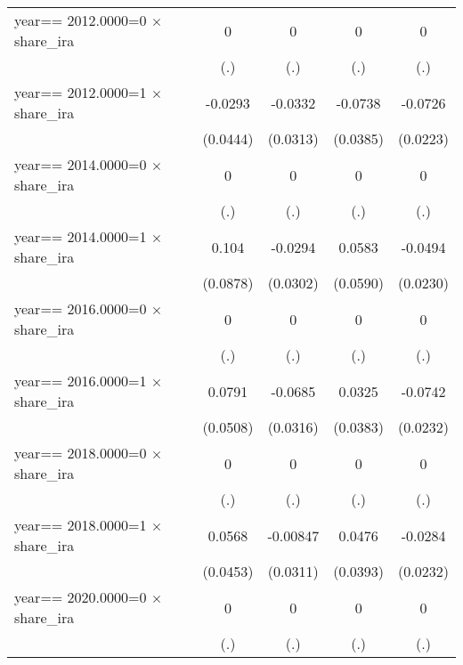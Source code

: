 \begin{table}[htbp]
\begin{tabular}{l*{4}{c}}
year==  2012.0000=0 $\times$ share\_ira&        0         &        0         &        0         &        0         \\
                &      (.)         &      (.)         &      (.)         &      (.)         \\
year==  2012.0000=1 $\times$ share\_ira&  -0.0293         &  -0.0332         &  -0.0738\sym{*}  &  -0.0726\sym{***}\\
                & (0.0444)         & (0.0313)         & (0.0385)         & (0.0223)         \\
year==  2014.0000=0 $\times$ share\_ira&        0         &        0         &        0         &        0         \\
                &      (.)         &      (.)         &      (.)         &      (.)         \\
year==  2014.0000=1 $\times$ share\_ira&    0.104         &  -0.0294         &   0.0583         &  -0.0494\sym{**} \\
                & (0.0878)         & (0.0302)         & (0.0590)         & (0.0230)         \\
year==  2016.0000=0 $\times$ share\_ira&        0         &        0         &        0         &        0         \\
                &      (.)         &      (.)         &      (.)         &      (.)         \\
year==  2016.0000=1 $\times$ share\_ira&   0.0791         &  -0.0685\sym{**} &   0.0325         &  -0.0742\sym{***}\\
                & (0.0508)         & (0.0316)         & (0.0383)         & (0.0232)         \\
year==  2018.0000=0 $\times$ share\_ira&        0         &        0         &        0         &        0         \\
                &      (.)         &      (.)         &      (.)         &      (.)         \\
year==  2018.0000=1 $\times$ share\_ira&   0.0568         & -0.00847         &   0.0476         &  -0.0284         \\
                & (0.0453)         & (0.0311)         & (0.0393)         & (0.0232)         \\
year==  2020.0000=0 $\times$ share\_ira&        0         &        0         &        0         &        0         \\
                &      (.)         &      (.)         &      (.)         &      (.)         \\

\end{tabular}
\end{table}
